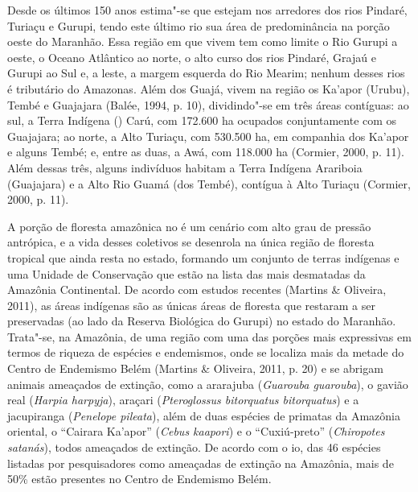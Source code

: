 Desde os últimos 150 anos estima"-se que estejam nos arredores dos rios
Pindaré, Turiaçu e Gurupi, tendo este último rio sua área de
predominância na porção oeste do Maranhão. Essa região em que vivem tem
como limite o Rio Gurupi a oeste, o Oceano Atlântico ao norte, o alto
curso dos rios Pindaré, Grajaú e Gurupi ao Sul e, a leste, a margem
esquerda do Rio Mearim; nenhum desses rios é tributário do Amazonas.
Além dos Guajá, vivem na região os Ka'apor (Urubu), Tembé e Guajajara
(Balée, 1994, p. 10), dividindo"-se em três áreas contíguas: ao sul, a
Terra Indígena () Carú, com 172.600 ha ocupados conjuntamente com os
Guajajara; ao norte, a  Alto Turiaçu, com 530.500 ha, em companhia dos
Ka'apor e alguns Tembé; e, entre as duas, a  Awá, com 118.000 ha
(Cormier, 2000, p. 11). Além dessas três, alguns indivíduos habitam a
Terra Indígena Arariboia (Guajajara) e a  Alto Rio Guamá (dos Tembé),
contígua à  Alto Turiaçu (Cormier, 2000, p. 11).

A porção de floresta amazônica no  é um cenário com alto grau de
pressão antrópica, e a vida desses coletivos se desenrola na única
região de floresta tropical que ainda resta no estado, formando um
conjunto de terras indígenas e uma Unidade de Conservação que estão na
lista das mais desmatadas da Amazônia Continental. De acordo com estudos
recentes (Martins \& Oliveira, 2011), as áreas indígenas são as únicas
áreas de floresta que restaram a ser preservadas (ao lado da Reserva
Biológica do Gurupi) no estado do Maranhão. Trata"-se, na Amazônia, de
uma região com uma das porções mais expressivas em termos de riqueza de
espécies e endemismos, onde se localiza mais da metade do Centro de
Endemismo Belém (Martins \& Oliveira, 2011, p. 20) e se abrigam animais
ameaçados de extinção, como a ararajuba (\emph{Guarouba guarouba}), o
gavião real (\emph{Harpia harpyja}), araçari (\emph{Pteroglossus
bitorquatus bitorquatus}) e a jacupiranga (\emph{Penelope pileata}),
além de duas espécies de primatas da Amazônia oriental, o ``Cairara
Ka'apor'' (\emph{Cebus kaapori}) e o ``Cuxiú-preto'' (\emph{Chiropotes
satanás}), todos ameaçados de extinção. De acordo com o io, das 46
espécies listadas por pesquisadores como ameaçadas de extinção na
Amazônia, mais de 50\% estão presentes no Centro de Endemismo Belém.

